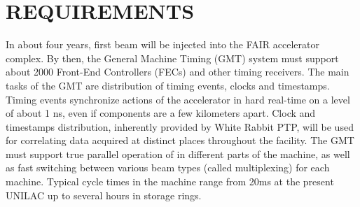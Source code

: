 \section{REQUIREMENTS}



In  about  four years,  first  beam will  be  injected  into the  FAIR
accelerator complex. By then,  the General Machine Timing (GMT) system
must support about 2000  Front-End Controllers (FECs) and other timing
receivers.   The main  tasks of  the  GMT are  distribution of  timing
events, clocks  and timestamps.  Timing events  synchronize actions of
the accelerator  in hard real-time on a  level of about 1  ns, even if
components  are   a  few  kilometers  apart.    Clock  and  timestamps
distribution, inherently  provided by White  Rabbit PTP, will  be used
for  correlating  data  acquired  at distinct  places  throughout  the
facility. The GMT must support true parallel operation of in different
parts of the  machine, as well as fast  switching between various beam
types (called multiplexing) for  each machine.  Typical cycle times in
the machine range from 20ms at  the present UNILAC up to several hours
in storage rings.

